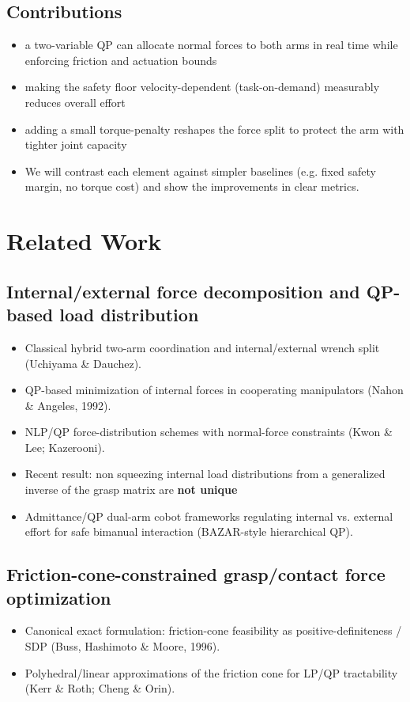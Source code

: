 \documentclass[conference]{IEEEtran}
\begin{document}
\subsection*{Contributions}
\begin{itemize}
    \item a two-variable QP can allocate normal forces to both arms in real time while enforcing friction and actuation bounds
    \item making the safety floor velocity-dependent (task-on-demand) measurably reduces overall effort
    \item adding a small torque-penalty reshapes the force split to protect the arm with tighter joint capacity
    \item We will contrast each element against simpler baselines (e.g. fixed safety margin, no torque cost) and show the improvements in clear metrics.  
\end{itemize}


\section*{Related Work}

\subsection*{Internal/external force decomposition and QP-based load distribution}
\begin{itemize}
    \item Classical hybrid two-arm coordination and internal/external wrench split (Uchiyama \& Dauchez).
    \item QP-based minimization of internal forces in cooperating manipulators (Nahon \& Angeles, 1992).
    \item NLP/QP force-distribution schemes with normal-force constraints (Kwon \& Lee; Kazerooni).
    \item Recent result: non squeezing internal load distributions from a generalized inverse of the grasp matrix are \textbf{not unique}
    \item Admittance/QP dual-arm cobot frameworks regulating internal vs. external effort for safe bimanual interaction (BAZAR-style hierarchical QP).
\end{itemize}

\subsection*{Friction-cone-constrained grasp/contact force optimization}
\begin{itemize}
    \item Canonical exact formulation: friction-cone feasibility as positive-definiteness / SDP (Buss, Hashimoto \& Moore, 1996).
    \item Polyhedral/linear approximations of the friction cone for LP/QP tractability (Kerr \& Roth; Cheng \& Orin).
\end{itemize}
\end{document}
